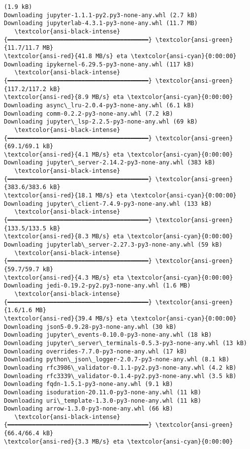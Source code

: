 \documentclass[11pt]{article}
\begin{document}
\begin{Verbatim}[commandchars=\\\{\}]
(1.9 kB)
Downloading jupyter-1.1.1-py2.py3-none-any.whl (2.7 kB)
Downloading jupyterlab-4.3.1-py3-none-any.whl (11.7 MB)
   \textcolor{ansi-black-intense}{━━━━━━━━━━━━━━━━━━━━━━━━━━━━━━━━━━━━━━━━} \textcolor{ansi-green}{11.7/11.7 MB}
\textcolor{ansi-red}{41.8 MB/s} eta \textcolor{ansi-cyan}{0:00:00}
Downloading ipykernel-6.29.5-py3-none-any.whl (117 kB)
   \textcolor{ansi-black-intense}{━━━━━━━━━━━━━━━━━━━━━━━━━━━━━━━━━━━━━━━━} \textcolor{ansi-green}{117.2/117.2 kB}
\textcolor{ansi-red}{8.9 MB/s} eta \textcolor{ansi-cyan}{0:00:00}
Downloading async\_lru-2.0.4-py3-none-any.whl (6.1 kB)
Downloading comm-0.2.2-py3-none-any.whl (7.2 kB)
Downloading jupyter\_lsp-2.2.5-py3-none-any.whl (69 kB)
   \textcolor{ansi-black-intense}{━━━━━━━━━━━━━━━━━━━━━━━━━━━━━━━━━━━━━━━━} \textcolor{ansi-green}{69.1/69.1 kB}
\textcolor{ansi-red}{4.1 MB/s} eta \textcolor{ansi-cyan}{0:00:00}
Downloading jupyter\_server-2.14.2-py3-none-any.whl (383 kB)
   \textcolor{ansi-black-intense}{━━━━━━━━━━━━━━━━━━━━━━━━━━━━━━━━━━━━━━━━} \textcolor{ansi-green}{383.6/383.6 kB}
\textcolor{ansi-red}{18.1 MB/s} eta \textcolor{ansi-cyan}{0:00:00}
Downloading jupyter\_client-7.4.9-py3-none-any.whl (133 kB)
   \textcolor{ansi-black-intense}{━━━━━━━━━━━━━━━━━━━━━━━━━━━━━━━━━━━━━━━━} \textcolor{ansi-green}{133.5/133.5 kB}
\textcolor{ansi-red}{8.3 MB/s} eta \textcolor{ansi-cyan}{0:00:00}
Downloading jupyterlab\_server-2.27.3-py3-none-any.whl (59 kB)
   \textcolor{ansi-black-intense}{━━━━━━━━━━━━━━━━━━━━━━━━━━━━━━━━━━━━━━━━} \textcolor{ansi-green}{59.7/59.7 kB}
\textcolor{ansi-red}{4.3 MB/s} eta \textcolor{ansi-cyan}{0:00:00}
Downloading jedi-0.19.2-py2.py3-none-any.whl (1.6 MB)
   \textcolor{ansi-black-intense}{━━━━━━━━━━━━━━━━━━━━━━━━━━━━━━━━━━━━━━━━} \textcolor{ansi-green}{1.6/1.6 MB}
\textcolor{ansi-red}{39.4 MB/s} eta \textcolor{ansi-cyan}{0:00:00}
Downloading json5-0.9.28-py3-none-any.whl (30 kB)
Downloading jupyter\_events-0.10.0-py3-none-any.whl (18 kB)
Downloading jupyter\_server\_terminals-0.5.3-py3-none-any.whl (13 kB)
Downloading overrides-7.7.0-py3-none-any.whl (17 kB)
Downloading python\_json\_logger-2.0.7-py3-none-any.whl (8.1 kB)
Downloading rfc3986\_validator-0.1.1-py2.py3-none-any.whl (4.2 kB)
Downloading rfc3339\_validator-0.1.4-py2.py3-none-any.whl (3.5 kB)
Downloading fqdn-1.5.1-py3-none-any.whl (9.1 kB)
Downloading isoduration-20.11.0-py3-none-any.whl (11 kB)
Downloading uri\_template-1.3.0-py3-none-any.whl (11 kB)
Downloading arrow-1.3.0-py3-none-any.whl (66 kB)
   \textcolor{ansi-black-intense}{━━━━━━━━━━━━━━━━━━━━━━━━━━━━━━━━━━━━━━━━} \textcolor{ansi-green}{66.4/66.4 kB}
\textcolor{ansi-red}{3.3 MB/s} eta \textcolor{ansi-cyan}{0:00:00}

\end{Verbatim}
\end{document}
